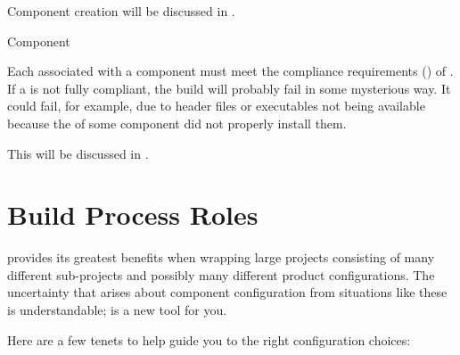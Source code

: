 \begin{description}
  Component creation will be discussed in
  .

\item Component \makefile

  Each \makefile associated with a component must meet the compliance
  requirements () of \lmsbw.  If a
  \makefile is not fully compliant, the build will probably fail in
  some mysterious way.  It could fail, for example, due to header
  files or executables not being available because the \makefile of
  some component did not properly install them.

  This will be discussed in .

\end{description}

\section{Build Process Roles}\label{wrap:build-process-roles}

\lmsbw provides its greatest benefits when wrapping large projects
consisting of many different sub-projects and possibly many different
product configurations.  The uncertainty that arises about component
configuration from situations like these is understandable; \lmsbw is
a new tool for you.

Here are a few tenets to help guide you to the right configuration
choices:

